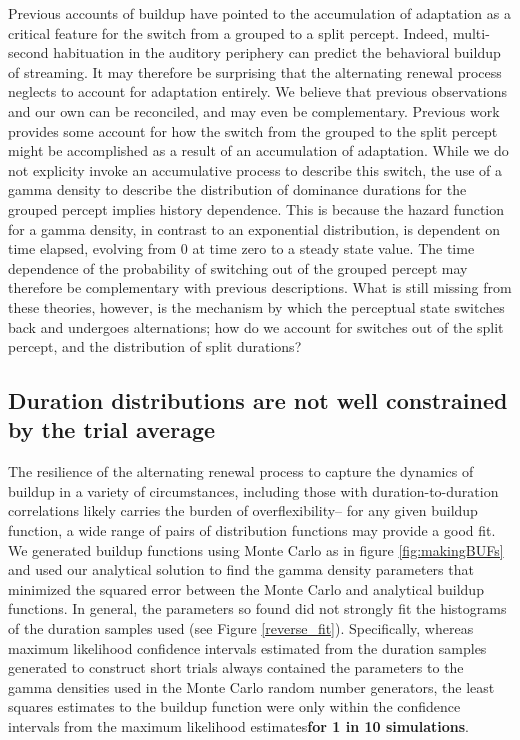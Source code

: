 \documentclass[10pt]{article}
\begin{document}
Previous accounts of buildup \cite{Micheyl2005}\cite{Pressnitzer2008} have pointed to the accumulation of adaptation as a critical feature for the switch from a grouped to a split percept. Indeed, multi-second habituation in the auditory periphery \cite{Pressnitzer2008} can predict the behavioral buildup of streaming. It may therefore be surprising that the alternating renewal process neglects to account for adaptation entirely. We believe that previous observations and our own can be reconciled, and may even be complementary. Previous work provides some account for how the switch from the grouped to the split percept might be accomplished as a result of an accumulation of adaptation. While we do not explicity invoke an accumulative process to describe this switch, the use of a gamma density to describe the distribution of dominance durations for the grouped percept implies history dependence. This is because the hazard function for a gamma density, in contrast to an exponential distribution, is dependent on time elapsed, evolving from 0 at time zero to a steady state value. The time dependence of the probability of switching out of the grouped percept may therefore be complementary with previous descriptions. What is still missing from these theories, however, is the mechanism by which the perceptual state switches back and undergoes alternations; how do we account for switches out of the split percept, and the distribution of split durations?

\subsection*{Duration distributions are not well constrained by the trial average}
The resilience of the alternating renewal process to capture the dynamics of buildup in a variety of circumstances, including those with duration-to-duration correlations likely carries the burden of overflexibility-- for any given buildup function, a wide range of pairs of distribution functions may provide a good fit. We generated buildup functions using Monte Carlo as in figure \ref{fig:makingBUFs} and used our analytical solution to find the gamma density parameters that minimized the squared error between the Monte Carlo and analytical buildup functions. In general, the parameters so found did not strongly fit the histograms of the duration samples used (see Figure \ref{reverse_fit}). Specifically, whereas maximum likelihood confidence intervals estimated from the duration samples generated to construct short trials always contained the parameters to the gamma densities used in the Monte Carlo random number generators, the least squares estimates to the buildup function were only within the confidence intervals from the maximum likelihood estimates\textbf{for 1 in 10 simulations}.
\end{document}
